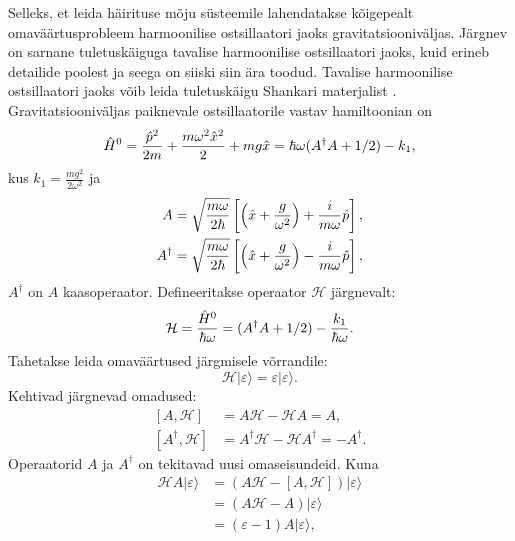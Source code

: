 \documentclass{trkut}%
\renewcommand\ket[1]{{|{#1}\rangle}}
\begin{document}
Selleks, et leida häirituse mõju süsteemile lahendatakse kõigepealt omaväärtusprobleem harmoonilise ostsillaatori jaoks gravitatsiooniväljas.
Järgnev on sarnane tuletuskäiguga tavalise harmoonilise ostsillaatori jaoks, kuid erineb detailide poolest ja seega on siiski siin ära toodud.
Tavalise harmoonilise ostsillaatori jaoks võib leida tuletuskäigu Shankari materjalist \parencite[202-216]{shankar94}.
Gravitatsiooniväljas paiknevale ostsillaatorile vastav hamiltoonian on
\begin{equation}
    \op[0]{H}=\frac{\op{p}^2}{2m}+\frac{m\omega^2 \op{x}^2}{2} + mg\op{x}=\hbar \omega (A^\dagger A + 1/2)-k_1,
\end{equation}
kus $k_1=\frac{mg^2}{2\omega^2}$ ja
\begin{align}
    \begin{split}
        A &= \sqrt{\frac{m\omega}{2\hbar}}\left[ \left( \op{x} + \frac{g}{\omega^2} \right) + \frac{i}{m\omega} \op{p} \right], \\
        A^\dagger &= \sqrt{\frac{m\omega}{2\hbar}}\left[ \left( \op{x} + \frac{g}{\omega^2} \right) - \frac{i}{m\omega} \op{p} \right],
    \end{split}
\end{align}
$A^\dagger$ on $A$ kaasoperaator.
Defineeritakse operaator $\mathcal{H}$ järgnevalt:
\begin{equation}
    \mathcal{H} = \frac{\op[0]{H}}{\hbar \omega}=(A^\dagger A + 1/2)-\frac{k_1}{\hbar \omega}.
    \label{mathcalH}
\end{equation}
Tahetakse leida omaväärtused järgmisele võrrandile:
\begin{equation}
    \mathcal{H}\ket{\varepsilon}=\varepsilon \ket{\varepsilon}.
\end{equation}
Kehtivad järgnevad omadused:
\begin{align}
    \left[A, \mathcal{H}\right] &=A\mathcal{H} - \mathcal{H}A=A, \\
    \left[A^\dagger, \mathcal{H}\right] &= A^\dagger \mathcal{H} - \mathcal{H} A^\dagger = -A^\dagger.
\end{align}
Operaatorid $A$ ja $A^\dagger$ on tekitavad uusi omaseisundeid. Kuna
\begin{align}
        \mathcal{H}A\ket{\varepsilon}&=\left(A\mathcal{H}-[A, \mathcal{H}]\right)\ket{\varepsilon} \nonumber\\
        &=(A\mathcal{H}-A)\ket{\varepsilon} \nonumber\\
        &=(\varepsilon - 1)A\ket{\varepsilon},
\end{align}
\end{document}
